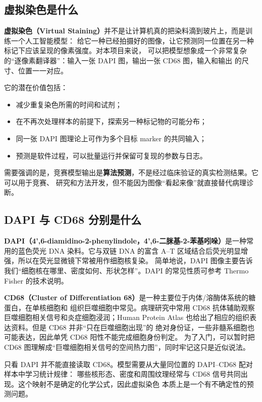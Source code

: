\documentclass[12pt,a4paper,UTF8]{ctexart}
\newcommand{\term}[2]{\textbf{#1（#2）}}
\begin{document}
\subsection{虚拟染色是什么}

\term{虚拟染色}{Virtual Staining}并不是让计算机真的把染料滴到玻片上，而是训练一个人工智能模型：
给它一种已经拍摄好的图像，让它预测同一位置在另一种标记下应该呈现的像素强度。对本项目来说，
可以把模型想象成一个非常复杂的“逐像素翻译器”：输入一张 DAPI 图，输出一张 CD68 图，输入和输出
的尺寸、位置一一对应。

它的潜在价值包括：

\begin{itemize}
  \item 减少重复染色所需的时间和试剂；
  \item 在不再次处理样本的前提下，探索另一种标记物的可能分布；
  \item 同一张 DAPI 图理论上可作为多个目标 marker 的共同输入；
  \item 预测是软件过程，可以批量运行并保留可复现的参数与日志。
\end{itemize}

需要强调的是，竞赛模型输出是\textbf{算法预测}，不是经过临床验证的真实检测结果。它可以用于竞赛、
研究和方法开发，但不能因为图像“看起来像”就直接替代病理诊断。

\subsection{DAPI 与 CD68 分别是什么}

\term{DAPI}{4',6-diamidino-2-phenylindole，4',6-二脒基-2-苯基吲哚}是一种常用的蓝色荧光 DNA
染料。它与双链 DNA 的富含 A--T 区域结合后荧光明显增强，所以在荧光显微镜下常被用作细胞核复染。
简单地说，DAPI 图像主要告诉我们“细胞核在哪里、密度如何、形状怎样”。DAPI 的常见性质可参考
Thermo Fisher 的技术说明\cite{thermofisher_dapi}。

\term{CD68}{Cluster of Differentiation 68}是一种主要位于内体/溶酶体系统的糖蛋白，在单核细胞和
组织巨噬细胞中常见。病理研究中常用 CD68 抗体辅助观察巨噬细胞相关信号和炎症细胞浸润；Human
Protein Atlas 也给出了相应的组织表达资料\cite{hpa_cd68}。但是 CD68 并非“只在巨噬细胞出现”的
绝对身份证，一些非髓系细胞也可能表达，因此单凭 CD68 阳性不能完成细胞身份判定\cite{cd68_specificity}。
为了入门，可以暂时把 CD68 图理解成“巨噬细胞相关信号的空间热力图”，同时牢记这只是近似说法。

只看 DAPI 并不能直接读取 CD68。模型需要从大量同位置的 DAPI--CD68 配对样本中学习统计规律：
哪些核形态、密度和周围纹理经常与 CD68 信号共同出现。这个映射不是确定的化学公式，因此虚拟染色
本质上是一个有不确定性的预测问题。
\end{document}
